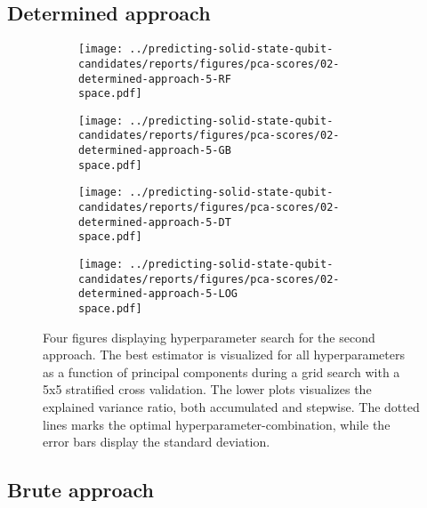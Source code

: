 \clearpage

\subsection{Determined approach}

\begin{figure}[!tbp]
  \begin{subfigure}[b]{0.5\textwidth}
    \texttt{[image: ../predicting-solid-state-qubit-candidates/reports/figures/pca-scores/02-determined-approach-5-RF\\space.pdf]}
    \caption{}
    \label{fig:q2-GB}
  \end{subfigure}%
  \hfill
  \begin{subfigure}[b]{0.5\textwidth}
    \texttt{[image: ../predicting-solid-state-qubit-candidates/reports/figures/pca-scores/02-determined-approach-5-GB\\space.pdf]}
    \caption{}
    \label{fig:q2-RF}
  \end{subfigure}

  \begin{subfigure}[b]{0.5\textwidth}
    \texttt{[image: ../predicting-solid-state-qubit-candidates/reports/figures/pca-scores/02-determined-approach-5-DT\\space.pdf]}
    \caption{}
    \label{fig:q2-DT}
  \end{subfigure}%
  \hfill
  \begin{subfigure}[b]{0.5\textwidth}
    \texttt{[image: ../predicting-solid-state-qubit-candidates/reports/figures/pca-scores/02-determined-approach-5-LOG\\space.pdf]}
    \caption{}
    \label{fig:q2-LOG}
  \end{subfigure}
  \caption{{Four figures displaying hyperparameter search for the second approach. The best estimator is visualized for all hyperparameters as a function of principal components during a grid search with a 5x5 stratified cross validation. The lower plots visualizes the explained variance ratio, both accumulated and stepwise. The dotted lines marks the optimal hyperparameter-combination, while the error bars display the standard deviation. }}
\end{figure}

\clearpage

\subsection{Brute approach}


